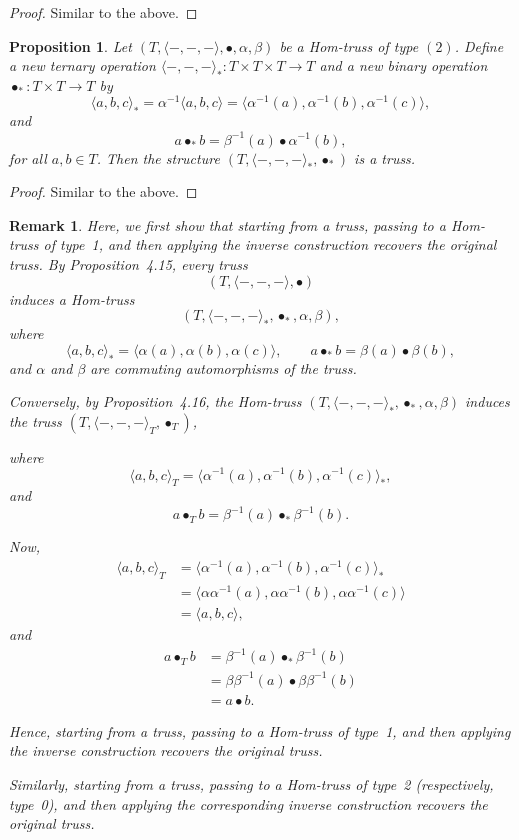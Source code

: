 \documentclass[14pt]{article}
\newtheorem{prop}[thm]{Proposition}
\theoremstyle{Definition}
\newtheorem{Rem}[thm]{Remark}
\theoremstyle{remark}
\begin{document}
\begin{proof}
Similar to the above.
\end{proof}
\begin{prop}
Let $(T,\langle-,-,-\rangle,\bullet,\alpha,\beta)$ be a Hom-truss of type $(2)$.  
Define a new ternary operation $\langle-,-,-\rangle_{\ast} : T \times T \times T \to T$  
and a new binary operation $\bullet_{\ast} : T \times T \to T$ by  
\[
\langle a,b,c\rangle_{\ast} = \alpha^{-1}\langle a,b,c\rangle 
= \langle \alpha^{-1}(a),\alpha^{-1}(b),\alpha^{-1}(c) \rangle,
\]
and  
\[
a \bullet_{\ast} b = \beta^{-1}(a) \bullet \alpha^{-1}(b),
\]
for all $a,b \in T$. Then the structure $(T,\langle-,-,-\rangle_{\ast},\bullet_{\ast})$ is a truss.
\end{prop}
\begin{proof}
Similar to the above.
\end{proof}
\begin{Rem}
Here, we first show that starting from a truss, passing to a Hom-truss of type~1, and then applying the inverse construction recovers the original truss.
By Proposition~4.15, every truss
\[
(T,\langle-,-,-\rangle,\bullet)
\]
induces a Hom-truss
\[
(T,\langle-,-,-\rangle_{\ast},\bullet_{\ast},\alpha,\beta),
\]
where
\[
\langle a,b,c\rangle_{\ast}
=\langle\alpha(a),\alpha(b),\alpha(c)\rangle,\qquad
a\bullet_{\ast}b=\beta(a)\bullet\beta(b),
\]
and $\alpha$ and $\beta$ are commuting automorphisms of the truss.

Conversely, by Proposition~4.16, the Hom-truss $(T,\langle-,-,-\rangle_{\ast},\bullet_{\ast},\alpha,\beta)$ induces the truss $(T,\langle-,-,-\rangle_{T},\bullet_{T})$,

where
\[
\langle a,b,c\rangle_{T}
=
\bigl\langle
\alpha^{-1}(a),
\alpha^{-1}(b),
\alpha^{-1}(c)
\bigr\rangle_{\ast},
\]
and
\[
a\bullet_{T} b
=
\beta^{-1}(a)\bullet_{\ast}\beta^{-1}(b).
\]

Now,
\begin{align*}
\langle a,b,c\rangle_{T}
&=
\langle
\alpha^{-1}(a),
\alpha^{-1}(b),
\alpha^{-1}(c)
\rangle_{\ast}\\
&=
\langle
\alpha\alpha^{-1}(a),
\alpha\alpha^{-1}(b),
\alpha\alpha^{-1}(c)
\rangle\\
&=
\langle a,b,c\rangle,
\end{align*}
and
\begin{align*}
a\bullet_{T} b
&=
\beta^{-1}(a)\bullet_{\ast}\beta^{-1}(b)\\
&=
\beta\beta^{-1}(a)\bullet\beta\beta^{-1}(b)\\
&=
a\bullet b.
\end{align*}

Hence, starting from a truss, passing to a Hom-truss of type~1, and then applying the inverse construction recovers the original truss.

Similarly, starting from a truss, passing to a Hom-truss of type~2 (respectively, type~0), and then applying the corresponding inverse construction recovers the original truss.

\end{Rem}
\end{document}
